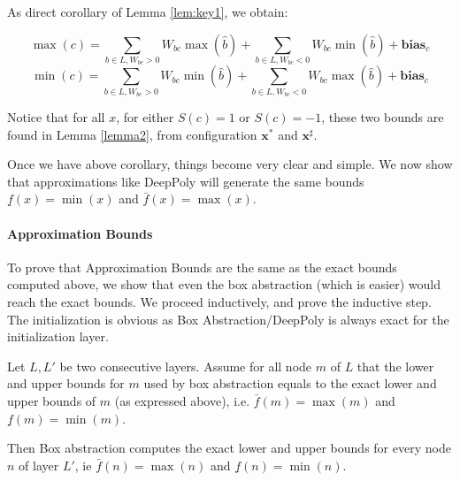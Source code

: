 	
	As direct corollary of Lemma \ref{lem:key1}, we obtain:
	
	\begin{corollary}
		\label{cor1}
		$$\max(c)=\sum_{b \in L, W_{bc}>0}W_{bc} \max(\hat{b}) + \sum_{b \in L, W_{bc}<0}W_{bc} \min(\hat{b}) + \boldsymbol{bias}_c$$
		$$\min(c)=\sum_{b \in L, W_{bc}>0}W_{bc} \min(\hat{b}) + \sum_{b \in L, W_{bc}<0}W_{bc} \max(\hat{b}) + \boldsymbol{bias}_c$$
	\end{corollary}
	
	
	Notice that for all $x$, for either $S(c)=1$ or $S(c)=-1$, these two bounds are found in Lemma \ref{lemma2},
	from configuration $\boldsymbol{x}^*$ and $\boldsymbol{x}^\sharp$.
	
	
	
	Once we have above corollary, things become very clear and simple. We now show that approximations like DeepPoly will generate the same bounds 
	$\underline{f}(x)=\min(x)$ and $\bar{f}(x)=\max(x)$.
	
	\paragraph{Approximation Bounds}
	
	To prove that Approximation Bounds are the same as the exact bounds computed above, 
	we show that even the box abstraction (which is easier) would reach the exact bounds.
	We proceed inductively, and prove the inductive step.
	The initialization is obvious as Box Abstraction/DeepPoly is always exact for the initialization layer.
	
	\begin{lemma}
		Let $L,L'$ be two consecutive layers.
		Assume for all node $m$ of $L$ that the lower and upper bounds for $m$ used by box abstraction equals to the exact lower and upper bounds of $m$ (as expressed above), i.e.
		$\bar{f}(m)=\max(m)$ and $\underline{f}(m)=\min(m)$.
		
		Then Box abstraction computes the exact lower and upper bounds for every node $n$ of layer $L'$, ie $\bar{f}(n)=\max(n)$ and $\underline{f}(n)=\min(n)$.
	\end{lemma}
	
